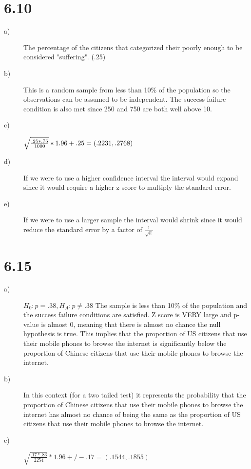 \documentclass{article}
\begin{document}
\section*{6.10}
\begin{description}
    \item[a)] The percentage of the citizens that categorized their poorly
        enough to be considered "suffering". (.25)
    \item[b)] This is a random sample from less than 10\% of the population
        so the observations can be assumed to be independent. The success-failure
        condition is also met since 250 and 750 are both well above 10.
    \item[c)] $\sqrt{\frac{.25*.75}{1000}} * 1.96 +\- .25 = (.2231, .2768)$
    \item[d)] If we were to use a higher confidence interval the interval would 
        expand since it would require a higher z score to multiply the standard 
        error.
    \item[e)] If we were to use a larger sample the interval would shrink since
        it would reduce the standard error by a factor of $\frac{1}{\sqrt{n}}$
\end{description}

\section*{6.15}
\begin{description}
    \item[a)] $H_0: p = .38, H_A: p \neq .38$ The sample is less than 10\% of 
        the population and the success failure conditions are satisfied. Z score
        is VERY large and p-value is almost 0, meaning that there is almost no chance
        the null hypothesis is true. This implies that the proportion of US citizens
        that use their mobile phones to browse the internet is significantly below
        the proportion of Chinese citizens that use their mobile phones to browse
        the internet.
    \item[b)] In this context (for a two tailed test) it represents the probability
        that the proportion of Chinese citizens that use their mobile phones to browse
        the internet has almost no chance of being the same as the proportion of 
        US citizens that use their mobile phones to browse the internet.
    \item[c)] $\sqrt{\frac{.17*.83}{2254}} * 1.96 +/- .17 = (.1544, .1855)$
\end{description} 
\end{document}
